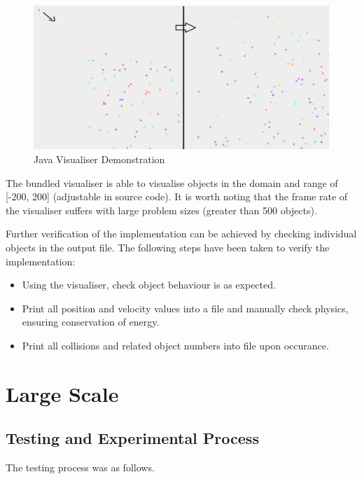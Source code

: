 \documentclass[twoside,twocolumn]{article}
\begin{document}
	\begin{figure}
		\caption{Java Visualiser Demonstration}
		\includegraphics[scale=.25]{visEx.png}
	\end{figure}
	
	
	The bundled visualiser is able to visualise objects in the domain and range of [-200, 200] (adjustable in source code). It is worth noting that the frame rate of the visualiser suffers with large problem sizes (greater than 500 objects). \newline
	
	Further verification of the implementation can be achieved by checking individual objects in the output file. The following steps have been taken to verify the implementation: \newline
	
	\begin{itemize}
		\item Using the visualiser, check object behaviour is as expected. 
		\item Print all position and velocity values into a file and manually check physics, ensuring conservation of energy.
		\item Print all collisions and related object numbers into file upon occurance.

	\end{itemize}
	
	
	\clearpage
	
	\section{Large Scale}
	
	
	\subsection{Testing and Experimental Process}
		
		The testing process was as follows.
	
\end{document}
